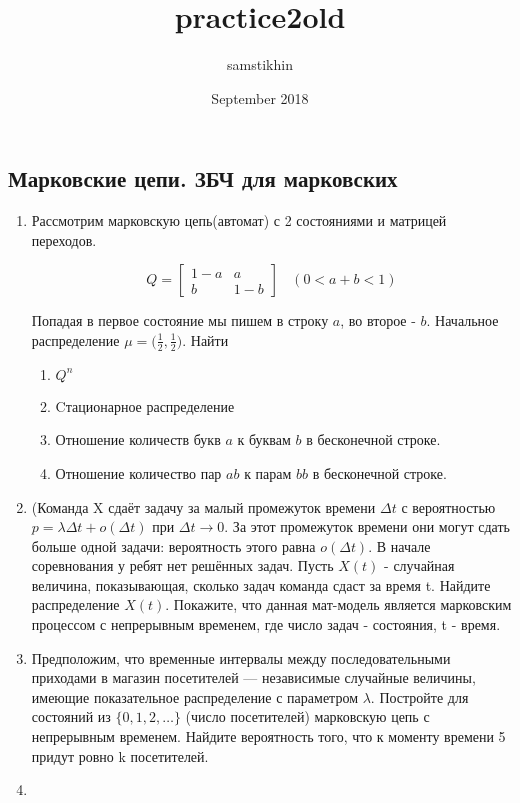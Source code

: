 \documentclass[a4paper, 14pt]{extarticle}
\title{practice2old}
\author{samstikhin}
\date{September 2018}
\begin{document}
\subsection*{Марковские цепи. ЗБЧ для марковских}
\begin{enumerate}
\item Рассмотрим марковскую цепь(автомат) с 2 состояниями и матрицей переходов.

$$Q = \begin{bmatrix}
        1 - a & a \\
        b & 1 - b 
\end{bmatrix} ~~~~(0 < a+b < 1)$$

Попадая в первое состояние мы пишем в строку $a$, во второе - $b$.
Начальное распределение $\mu = \Big(\frac{1}{2}, \frac{1}{2}\Big)$. 
Найти 
\begin{enumerate}
\item $Q^{n}$
\item Cтационарное распределение
\item Отношение количеств букв $a$ к буквам $b$ в бесконечной строке. 
\item Отношение количество пар $ab$ к парам $bb$ в бесконечной строке.
\end{enumerate}

\item (Команда X сдаёт задачу за малый промежуток времени $\Delta t$ с 
вероятностью $p = \lambda \Delta t + o(\Delta t)$ при $\Delta t \to 0$. 
За этот промежуток времени они могут сдать больше одной задачи: 
вероятность этого равна $o(\Delta t)$. 
В начале соревнования у ребят нет решённых задач. 
Пусть $X(t)$ - случайная величина, показывающая, 
сколько задач команда сдаст за время t. Найдите распределение $X(t)$. 
Покажите, что данная мат-модель является марковским процессом с непрерывным временем, 
где число задач - состояния, t - время.

\item Предположим, что временные интервалы между последовательными приходами в магазин 
посетителей — независимые случайные величины, имеющие показательное распределение 
с параметром $\lambda$. Постройте для состояний из $\{0, 1, 2, \ldots \}$ (число посетителей) 
марковскую цепь с непрерывным временем. 
Найдите вероятность того, что к моменту времени 5 придут ровно k посетителей.

\item 

\end{enumerate}
\end{document}
